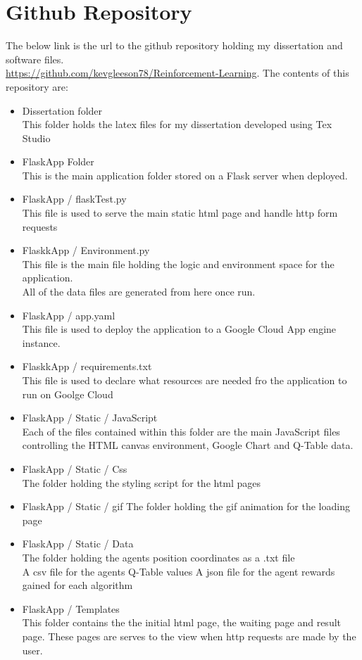 \section{Github Repository}
The below link is the url to the github repository holding my dissertation and software files.\\
\href{https://github.com/kevgleeson78/Reinforcement-Learning}{https://github.com/kevgleeson78/Reinforcement-Learning}.
The contents of this repository are:
\begin{itemize}
	\item Dissertation folder\\
	This folder holds the latex files for my dissertation developed using Tex Studio
	\item FlaskApp Folder\\
	This is the main application folder stored on a Flask server when deployed.
	\item FlaskApp / flaskTest.py\\
	This file is used to serve the main static html page and handle http form requests 
	\item FlaskkApp / Environment.py\\
	This file is the main file holding the logic and environment space for the application.\\
	All of the data files are generated from here once run.
	\item FlaskApp / app.yaml\\
	This file is used to deploy the application to a Google Cloud App engine instance.
	\item FlaskkApp / requirements.txt\\
	This file is used to declare what resources are needed fro the application to run on Goolge Cloud
	\item FlaskApp / Static / JavaScript\\
	Each of the files contained within this folder are the main JavaScript files controlling the HTML canvas environment, Google Chart and Q-Table data.
	\item FlaskApp / Static / Css\\
	The folder holding the styling script for the html pages
	\item FlaskApp / Static / gif
	The folder holding the gif animation for the loading page
	\item FlaskApp / Static / Data \\
	The folder holding the agents position coordinates as a .txt file\\
	A csv file for the agents Q-Table values
	A json file for the agent rewards gained for each algorithm
	\item FlaskApp / Templates\\
	This folder contains the the initial html page, the waiting page and result page. These pages are serves to the view when http requests are made by the user.
	
\end{itemize}

